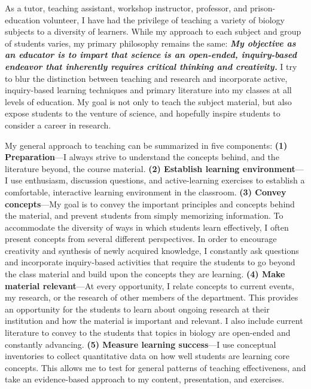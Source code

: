 As a tutor, teaching assistant, workshop
instructor, professor, and prison-education volunteer,
I have had the privilege of teaching a variety of biology subjects to a
diversity of learners.
While my approach to each subject and group of students varies, my primary
philosophy remains the same:
\textbf{\textit{My objective as an educator is to impart that
        science
        is an open-ended, inquiry-based endeavor that inherently requires
        critical thinking and creativity.}}
I try to blur the distinction between teaching and research and incorporate
active, inquiry-based learning techniques and primary literature into my
classes at all levels of
education.
My goal is not only to teach the subject material, but also expose students to
the venture of science, and hopefully inspire students to consider a
career in research.

My general approach to teaching can be summarized in five components:
\textbf{(1) Preparation}---I always strive to understand the concepts behind,
and the literature beyond, the course material.
\textbf{(2) Establish learning environment}---I use enthusiasm, discussion
questions, and active-learning exercises to establish a comfortable,
interactive learning environment in the classroom.
\textbf{(3) Convey concepts}---My goal is to convey the important principles
and concepts behind the material, and prevent students from simply memorizing
information.
To accommodate the diversity of ways in which students learn effectively, I
often present concepts from several different perspectives.
In order to encourage creativity and synthesis of newly acquired knowledge,
I constantly ask questions and incorporate inquiry-based activities that
require the students to go beyond the class material and build upon the
concepts they are learning.
\textbf{(4) Make material relevant}---At every opportunity, I relate concepts
to current events, my research, or the research of other members of the
department.
This provides an opportunity for the students to learn about ongoing
research at their institution and how the material is important and relevant.
I also include current literature to convey to the students that topics in
biology are open-ended and constantly advancing.
\textbf{(5) Measure learning success}---I use conceptual inventories to
collect quantitative data on how well students are learning core concepts.
This allows me to test for general patterns of teaching effectiveness, and take
an evidence-based approach to my content, presentation, and exercises.


